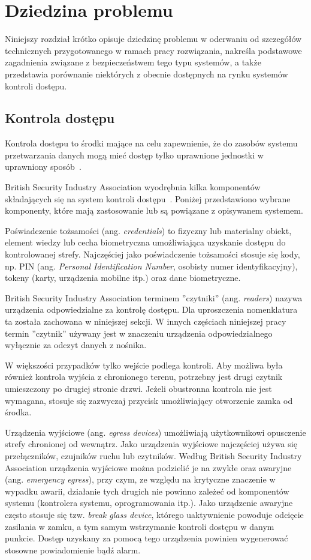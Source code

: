 \chapter{Dziedzina problemu}
\label{chap:problem-domain}

	Niniejszy rozdział krótko opisuje dziedzinę problemu w oderwaniu od szczegółów technicznych przygotowanego w ramach pracy rozwiązania, nakreśla podstawowe zagadnienia związane z bezpieczeństwem tego typu systemów, a także przedstawia porównanie niektórych z obecnie dostępnych na rynku systemów kontroli dostępu.

	\section{Kontrola dostępu}

		Kontrola dostępu to środki mające na celu zapewnienie, że do zasobów systemu przetwarzania danych mogą mieć dostęp tylko uprawnione jednostki w uprawniony sposób~\cite{pkn2002}.

		British Security Industry Association wyodrębnia kilka komponentów składających się na system kontroli dostępu~\cite{bsia2016}. Poniżej przedstawiono wybrane komponenty, które mają zastosowanie lub są powiązane z opisywanem systemem.

		Poświadczenie tożsamości (ang. \textit{credentials}) to fizyczny lub materialny obiekt, element wiedzy lub cecha biometryczna umożliwiająca uzyskanie dostępu do kontrolowanej strefy. Najczęściej jako poświadczenie tożsamości stosuje się kody, np. PIN (ang. \textit{Personal Identification Number}, osobisty numer identyfikacyjny), tokeny (karty, urządzenia mobilne itp.) oraz dane biometryczne.

		British Security Industry Association terminem ''czytniki'' (ang. \textit{readers}) nazywa urządzenia odpowiedzialne za kontrolę dostępu. Dla uproszczenia nomenklatura ta została zachowana w niniejszej sekcji. W innych częściach niniejszej pracy termin ''czytnik'' używany jest w znaczeniu urządzenia odpowiedzialnego wyłącznie za odczyt danych z nośnika.

		W większości przypadków tylko wejście podlega kontroli. Aby możliwa była również kontrola wyjścia z chronionego terenu, potrzebny jest drugi czytnik umieszczony po drugiej stronie drzwi. Jeżeli obustronna kontrola nie jest wymagana, stosuje się zazwyczaj przycisk umożliwiający otworzenie zamka od środka.

		Urządzenia wyjściowe (ang. \textit{egress devices}) umożliwiają użytkownikowi opusczenie strefy chronionej od wewnątrz. Jako urządzenia wyjściowe najczęściej używa się przełączników, czujników ruchu lub czytników. Według British Security Industry Association urządzenia wyjściowe można podzielić je na zwykłe oraz awaryjne (ang. \textit{emergency egress}), przy czym, ze względu na krytyczne znaczenie w wypadku awarii, działanie tych drugich nie powinno zależeć od komponentów systemu (kontrolera systemu, oprogramowania itp.). Jako urządzenie awaryjne często stosuje się tzw. \textit{break glass device}, którego uaktywnienie powoduje odcięcie zasilania w zamku, a tym samym wstrzymanie kontroli dostępu w danym punkcie. Dostęp uzyskany za pomocą tego urządzenia powinien wygenerować stosowne powiadomienie bądź alarm.

